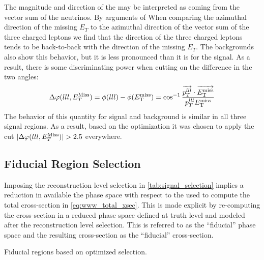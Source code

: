 The magnitude and direction
of the \MET may be interpreted as coming from the 
vector sum of the neutrinos.  By arguments of 
When comparing the azimuthal direction 
of the missing $E_{T}$ to the azimuthal direction of the vector
sum of the three charged leptons
we find that 
the direction of the three charged leptons
tends to be back-to-back with the direction of the 
missing $E_{T}$. The
backgrounds also show this behavior, but it is less pronounced than 
it is for the signal.  As a result, 
there is some discriminating power when cutting on the difference 
in the two angles: 
\begin{equation}
\Delta\varphi(lll,E_{T}^{\textrm{Miss}}) = \phi(lll)-\phi(E_{\mathrm{T}}^{\mathrm{miss}}) = \cos^{-1}\frac{ \overrightarrow{p_{T}^{lll}}\cdot\overrightarrow{E_{\mathrm{T}}^{\mathrm{miss}}} }{ p_{T}^{lll}E_{\mathrm{T}}^{\mathrm{miss}} } 
\end{equation}
The behavior of this quantity for signal and
background is similar in all three signal regions.
As a result, based on the 
optimization it was chosen to apply the cut
$|\Delta\varphi(lll,E_{T}^{\textrm{Miss}})| > 2.5$ everywhere.  



\subsection{Fiducial Region Selection}
\label{sec:fiducial}

Imposing the reconstruction level selection in \tab\ref{tab:signal_selection}
implies a reduction in available the phase space with respect to the 
used to compute the total cross-section in \eqn\eqref{eq:www_total_xsec}.
This is made explicit by re-computing the cross-section in a reduced
phase space defined at truth level and modeled after the reconstruction
level selection. This is referred to as the ``fiducial'' phase space
and the resulting cross-section as the ``fiducial'' cross-section.



\begin{table}[ht!]
\centering
\begin{small}

\end{small}
\caption{Fiducial regions based on optimized selection.}
\label{tab:fiducial_selection}
\end{table}

